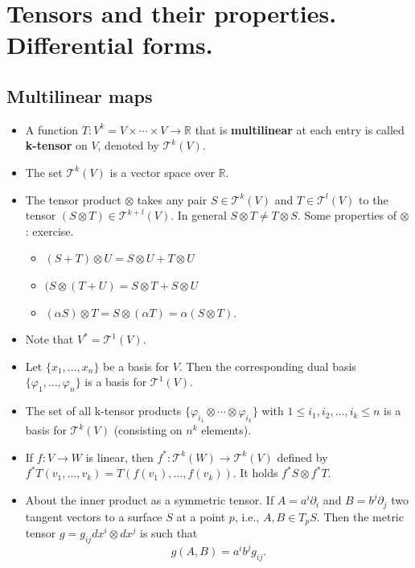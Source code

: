 \documentclass{amsart}
\begin{document}
\section{Tensors and their properties. Differential forms.}
\label{sec:org32a04ee}

\subsection{Multilinear maps}
\label{sec:orge8f4998}
\begin{itemize}
\item A function \(T:V^k = V\times\cdots\times V \to \mathbb{R}\) that is \textbf{multilinear} at each entry is called \textbf{k-tensor} on \(V\), denoted by \(\mathcal{T}^k(V)\).
\item The set \(\mathcal{T}^k(V)\) is a vector space over \(\mathbb{R}\).
\item The tensor product \(\otimes\) takes any pair \(S\in \mathcal{T}^k(V)\) and \(T\in \mathcal{T}^l(V)\) to the tensor \(\left(S \otimes T\right)\in \mathcal{T}^{k+l}(V)\). In general \(S\otimes T \neq T\otimes S\). Some properties of \(\otimes\): exercise.
\begin{itemize}
\item \((S + T) \otimes U  = S \otimes U + T \otimes U\)
\item \((S \otimes ( T + U)  = S \otimes T + S \otimes U\)
\item \((\alpha S) \otimes T = S\otimes (\alpha T) = \alpha (S \otimes T)\).
\end{itemize}
\item Note that \(V^* = \mathcal{T}^1(V)\).
\item Let \(\{ x_1, \ldots, x_n \}\) be a basis for \(V\). Then the corresponding dual basis \(\{ \varphi_1, \ldots, \varphi_n\}\) is a basis for \(\mathcal{T}^1(V)\).
\item The set of all k-tensor products \(\{ \varphi_{i_1} \otimes \cdots \otimes \varphi_{i_k} \}\) with \(1\leq i_1, i_2,\ldots,i_k \leq n\) is a basis for \(\mathcal{T}^k(V)\) (consisting on \(n^k\) elements).
\item If \(f:V\to W\) is linear, then \(f^*: \mathcal{T}^k(W) \to \mathcal{T}^k(V)\) defined by \(f^*T(v_1, \ldots, v_k) = T(f(v_1),\ldots,f(v_k))\). It holds \(f^*S \otimes f^*T\).
\item About the inner product as a symmetric tensor. If \(A = a^i\partial_i\) and \(B= b^j\partial_j\) two tangent vectors to a surface \(S\) at a point \(p\), i.e., \(A,B\in T_pS\). Then the metric tensor \(g = g_{ij}dx^i\otimes dx^j\) is such that \[ g(A,B) = a^ib^jg_{ij} .\]

\end{itemize}
\end{document}
